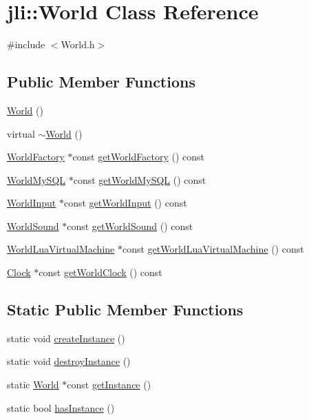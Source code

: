 \hypertarget{classjli_1_1_world}{\section{jli\+:\+:World Class Reference}
\label{classjli_1_1_world}
}


{\ttfamily \#include $<$World.\+h$>$}

\subsection*{Public Member Functions}
\begin{DoxyCompactItemize}
\item 
\hyperlink{classjli_1_1_world_ab340b6a4f69503333397ec65b091414a}{World} ()
\item 
virtual \hyperlink{classjli_1_1_world_a23e1f8b843020bdcec4b3ece3a89d1b8}{$\sim$\+World} ()
\item 
\hyperlink{classjli_1_1_world_factory}{World\+Factory} $\ast$const \hyperlink{classjli_1_1_world_aef4b78708b5daf80703d8a57f2b0f5ae}{get\+World\+Factory} () const 
\item 
\hyperlink{classjli_1_1_world_my_s_q_l}{World\+My\+S\+Q\+L} $\ast$const \hyperlink{classjli_1_1_world_ae8b75d8993a718753d589d49f2c00094}{get\+World\+My\+S\+Q\+L} () const 
\item 
\hyperlink{classjli_1_1_world_input}{World\+Input} $\ast$const \hyperlink{classjli_1_1_world_aeee764fef2643e963d08df7c891f4a26}{get\+World\+Input} () const 
\item 
\hyperlink{classjli_1_1_world_sound}{World\+Sound} $\ast$const \hyperlink{classjli_1_1_world_a00a7fc82c5723b567fa118e029712d34}{get\+World\+Sound} () const 
\item 
\hyperlink{classjli_1_1_world_lua_virtual_machine}{World\+Lua\+Virtual\+Machine} $\ast$const \hyperlink{classjli_1_1_world_a4a11fef67cef6d596344a5f5db79b4fb}{get\+World\+Lua\+Virtual\+Machine} () const 
\item 
\hyperlink{namespacejli_af69056b00744493ba074ef13e82b0bec}{Clock} $\ast$const \hyperlink{classjli_1_1_world_a4e35bb1d091a72f667de5c4cbc6e04b8}{get\+World\+Clock} () const 
\end{DoxyCompactItemize}
\subsection*{Static Public Member Functions}
\begin{DoxyCompactItemize}
\item 
static void \hyperlink{classjli_1_1_world_af250acadd5336ddfebbff7c934c4d410}{create\+Instance} ()
\item 
static void \hyperlink{classjli_1_1_world_afbf269b5621c765b5eadbdfc0bbc7457}{destroy\+Instance} ()
\item 
static \hyperlink{classjli_1_1_world}{World} $\ast$const \hyperlink{classjli_1_1_world_a206e13757c28b84d9739b052a2e37e99}{get\+Instance} ()
\item 
static bool \hyperlink{classjli_1_1_world_a730a4745d8a020a240d8445761ab69a8}{has\+Instance} ()
\end{DoxyCompactItemize}


